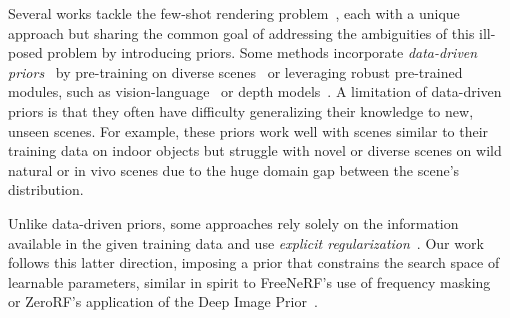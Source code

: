
Several works tackle the few-shot rendering problem~\cite{yu2021pixelnerf,chen2021mvsnerf,jain2021putting,wang2023sparsenerf,seo2023flipnerf,kim2022infonerf,yang2023freenerf,shi2024zerorf}, each with a unique approach but sharing the common goal of addressing the ambiguities of this ill-posed problem by introducing priors. Some methods incorporate \textit{data-driven priors}~\cite{yu2021pixelnerf,chen2021mvsnerf,jain2021putting,wang2023sparsenerf} by pre-training on diverse scenes~\cite{yu2021pixelnerf,chen2021mvsnerf} or leveraging robust pre-trained modules, such as vision-language~\cite{jain2021putting} or depth models~\cite{wang2023sparsenerf}.
A limitation of data-driven priors is that they often have difficulty generalizing their knowledge to new, unseen scenes.
For example, these priors work well with scenes similar to their training data on indoor objects but struggle with novel or diverse scenes on wild natural or in vivo scenes due to the huge domain gap between the scene's distribution.

Unlike data-driven priors, some approaches rely solely on the information available in the given training data and use \textit{explicit regularization}~\cite{seo2023flipnerf,kim2022infonerf,yang2023freenerf,shi2024zerorf}.
Our work follows this latter direction, imposing a prior that constrains the search space of learnable parameters, similar in spirit to FreeNeRF's use of frequency masking~\cite{yang2023freenerf} or ZeroRF's application of the Deep Image Prior~\cite{ulyanov2018deep,shi2024zerorf}.

